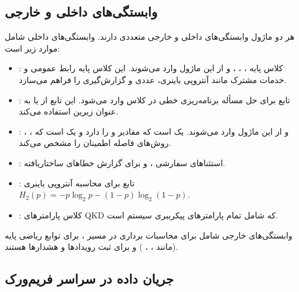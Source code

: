 \subsection{وابستگی‌های داخلی و خارجی}

هر دو ماژول وابستگی‌های داخلی و خارجی متعددی دارند. وابستگی‌های داخلی شامل موارد زیر است:

\begin{itemize}
	\item {}: کلاس پایه ، ، ،  و  از این ماژول وارد می‌شوند. این کلاس پایه رابط عمومی و خدمات مشترک مانند آنتروپی باینری،  عددی و گزارش‌گیری  را فراهم می‌سازد.
	\item {}: تابع  برای حل مسأله برنامه‌ریزی خطی در کلاس  وارد می‌شود. این تابع از  یا  به عنوان  زیرین استفاده می‌کند.
	\item {}: ، ،  و  از این ماژول وارد می‌شوند.  یک  است که مقادیر  و  را دارد و  یک  است که روش‌های فاصله اطمینان را مشخص می‌کند.
	\item {}: استثناهای سفارشی ،  و  برای گزارش خطاهای ساختاریافته.
	\item {}: تابع  برای محاسبه آنتروپی باینری $H_2(p) = -p \log_2 p - (1 - p) \log_2 (1 - p)$.
	\item {}: کلاس پارامترهای QKD که شامل تمام پارامترهای پیکرببری سیستم است.
\end{itemize}

وابستگی‌های خارجی شامل  برای محاسبات برداری در مسیر ،  برای توابع ریاضی پایه (مانند ، ، ) و  برای ثبت رویدادها و هشدارها هستند.

\subsection{جریان داده در سراسر فریم‌ورک}

